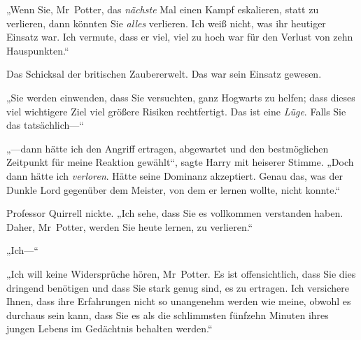 „Wenn Sie, Mr~Potter, das \emph{nächste} Mal einen Kampf eskalieren, statt zu verlieren, dann könnten Sie \emph{alles} verlieren. Ich weiß nicht, was ihr heutiger Einsatz war. Ich vermute, dass er viel, viel zu hoch war für den Verlust von zehn Hauspunkten.“

Das Schicksal der britischen Zaubererwelt. Das war sein Einsatz gewesen.

„Sie werden einwenden, dass Sie versuchten, ganz Hogwarts zu helfen; dass dieses viel wichtigere Ziel viel größere Risiken rechtfertigt. Das ist eine \emph{Lüge}. Falls Sie das tatsächlich—“

„—dann hätte ich den Angriff ertragen, abgewartet und den bestmöglichen Zeitpunkt für meine Reaktion gewählt“, sagte Harry mit heiserer Stimme. „Doch dann hätte ich \emph{verloren}. Hätte seine Dominanz akzeptiert. Genau das, was der Dunkle Lord gegenüber dem Meister, von dem er lernen wollte, nicht konnte.“

Professor Quirrell nickte. „Ich sehe, dass Sie es vollkommen verstanden haben. Daher, Mr~Potter, werden Sie heute lernen, zu verlieren.“

„Ich—“

„Ich will keine Widersprüche hören, Mr~Potter. Es ist offensichtlich, dass Sie dies dringend benötigen und dass Sie stark genug sind, es zu ertragen. Ich versichere Ihnen, dass ihre Erfahrungen nicht so unangenehm werden wie meine, obwohl es durchaus sein kann, dass Sie es als die schlimmsten fünfzehn Minuten ihres jungen Lebens im Gedächtnis behalten werden.“

